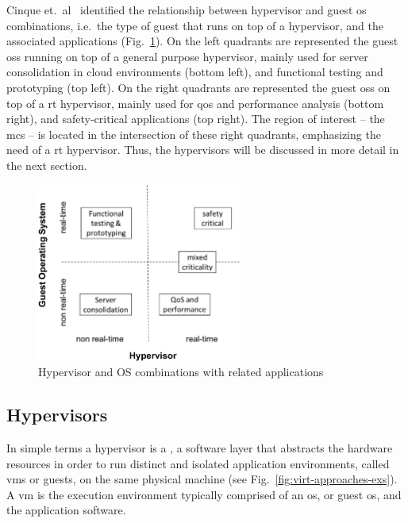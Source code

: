 Cinque et.~al~\cite{cinque2022virtualizing} identified the relationship between hypervisor and guest
\gls{os} combinations, i.e.~the type of guest that runs on top of a hypervisor, and the
associated applications (Fig.~\ref{fig:virt-combos}).
On the left quadrants are represented the guest \glspl{os} running on top of a
general purpose hypervisor, mainly used for server consolidation in cloud
environments (bottom left), and functional testing and prototyping (top left).
On the right quadrants are represented the guest \glspl{os} on top of a \gls{rt}
hypervisor, mainly used for \gls{qos} and performance analysis (bottom right), and
safety-critical applications (top right). The region of interest -- the
\gls{mcs} -- is located in the intersection of these right quadrants,
emphasizing the need of a \gls{rt} hypervisor. Thus, the hypervisors will be
discussed in more detail in the next section.

\begin{figure}[!hbt]
  \centering
  \includegraphics[width=0.6\textwidth]{./img/jpg/virt-combos} 
%   
  \caption[Hypervisor and OS combinations with related applications]{Hypervisor
    and OS combinations with related applications~\cite{cinque2022virtualizing}\footnotemark}%
  \label{fig:virt-combos}
\end{figure}
%
%

\subsection{Hypervisors}%
\label{sec:superv--hyperv}
In simple terms a hypervisor is a , a software layer that
abstracts the hardware resources in order to run distinct and isolated
application environments, called \glspl{vm} or guests, on the same physical
machine (see Fig.~\ref{fig:virt-approaches-exs}). A \gls{vm} is the execution environment typically comprised of an
\gls{os}, or guest \gls{os}, and the application software.

